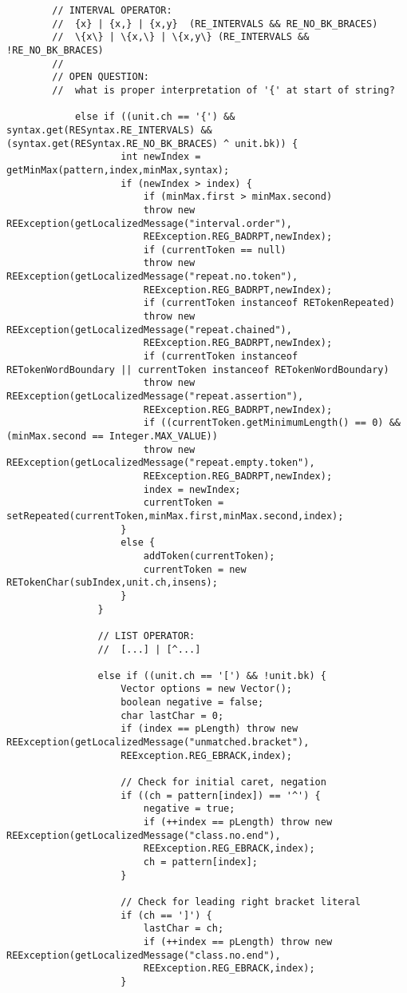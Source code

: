 \begin{mdframed}
\begin{lstlisting}
		// INTERVAL OPERATOR:
		//  {x} | {x,} | {x,y}  (RE_INTERVALS && RE_NO_BK_BRACES)
		//  \{x\} | \{x,\} | \{x,y\} (RE_INTERVALS && !RE_NO_BK_BRACES)
		//
		// OPEN QUESTION: 
		//  what is proper interpretation of '{' at start of string?
			
			else if ((unit.ch == '{') && syntax.get(RESyntax.RE_INTERVALS) && (syntax.get(RESyntax.RE_NO_BK_BRACES) ^ unit.bk)) {
					int newIndex = getMinMax(pattern,index,minMax,syntax);
					if (newIndex > index) {
						if (minMax.first > minMax.second)
						throw new REException(getLocalizedMessage("interval.order"),
						REException.REG_BADRPT,newIndex);
						if (currentToken == null)
						throw new REException(getLocalizedMessage("repeat.no.token"),
						REException.REG_BADRPT,newIndex);
						if (currentToken instanceof RETokenRepeated) 
						throw new REException(getLocalizedMessage("repeat.chained"),
						REException.REG_BADRPT,newIndex);
						if (currentToken instanceof RETokenWordBoundary || currentToken instanceof RETokenWordBoundary)
						throw new REException(getLocalizedMessage("repeat.assertion"),
						REException.REG_BADRPT,newIndex);
						if ((currentToken.getMinimumLength() == 0) && (minMax.second == Integer.MAX_VALUE))
						throw new REException(getLocalizedMessage("repeat.empty.token"),
						REException.REG_BADRPT,newIndex);
						index = newIndex;
						currentToken = setRepeated(currentToken,minMax.first,minMax.second,index); 
					}
					else {
						addToken(currentToken);
						currentToken = new RETokenChar(subIndex,unit.ch,insens);
					} 
				}
				
				// LIST OPERATOR:
				//  [...] | [^...]
				
				else if ((unit.ch == '[') && !unit.bk) {
					Vector options = new Vector();
					boolean negative = false;
					char lastChar = 0;
					if (index == pLength) throw new REException(getLocalizedMessage("unmatched.bracket"),
					REException.REG_EBRACK,index);
					
					// Check for initial caret, negation
					if ((ch = pattern[index]) == '^') {
						negative = true;
						if (++index == pLength) throw new REException(getLocalizedMessage("class.no.end"),
						REException.REG_EBRACK,index);
						ch = pattern[index];
					}
					
					// Check for leading right bracket literal
					if (ch == ']') {
						lastChar = ch;
						if (++index == pLength) throw new REException(getLocalizedMessage("class.no.end"),
						REException.REG_EBRACK,index);
					}
					

\end{lstlisting}
\end{mdframed}
